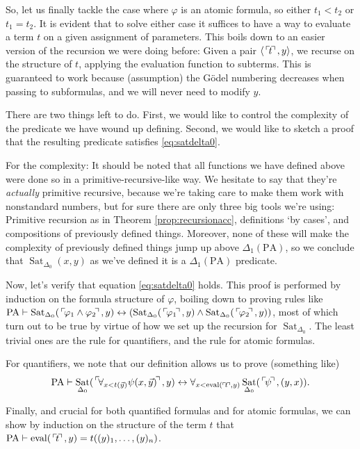 \documentclass{article}
\theoremstyle{nonumberplain}
\newcommand{\PA}{\mathrm{PA}}
\DeclareMathOperator{\Sat}{Sat}
\DeclareMathOperator{\eval}{eval}
\DeclarePairedDelimiter{\braket}{\langle}{\rangle}
\newcommand{\gn}[1]{\setbox0=\hbox{$\mathclap{\phantom{t}}#1$} \dimen0=\ht0 \advance\dimen0 by -1.25ex \,\raise\dimen0\hbox{$\ulcorner$} \! \box0 \! \raise\dimen0\hbox{$\urcorner$}\,}
\newcommand{\ssgn}[1]{\ulcorner\!#1\!\urcorner}
\begin{document}
So, let us finally tackle the case where $\varphi$ is an atomic formula, so either $t_1 < t_2$ or $t_1 = t_2$. It is evident that to solve either case it suffices to have a way to evaluate a term $t$ on a given assignment of parameters. This boils down to an easier version of the recursion we were doing before: Given a pair $\braket{\gn t, y}$, we recurse on the structure of $t$, applying the evaluation function to subterms. This is guaranteed to work because (assumption) the Gödel numbering decreases when passing to subformulas, and we will never need to modify $y$.

There are two things left to do. First, we would like to control the complexity of the predicate we have wound up defining. Second, we would like to sketch a proof that the resulting predicate satisfies \eqref{eq:satdelta0}.

For the complexity: It should be noted that all functions we have defined above were done so in a primitive-recursive-like way. We hesitate to say that they're \emph{actually} primitive recursive, because we're taking care to make them work with nonstandard numbers, but for sure there are only three big tools we're using: Primitive recursion as in Theorem \ref{prop:recursionacc}, definitions `by cases', and compositions of previously defined things. Moreover, none of these will make the complexity of previously defined things jump up above $\Delta_1(\PA)$, so we conclude that $\Sat_{\Delta_0}(x,y)$ as we've defined it is a $\Delta_1(\PA)$ predicate.

Now, let's verify that equation \eqref{eq:satdelta0} holds. This proof is performed by induction on the formula structure of $\varphi$, boiling down to proving rules like $\PA \vdash \Sat_{\Delta_0}(\gn{\varphi_1 \land \varphi_2}, y) \leftrightarrow (\Sat_{\Delta_0}(\gn{\varphi_1}, y) \land \Sat_{\Delta_0}(\gn{\varphi_2}, y))$, most of which turn out to be true by virtue of how we set up the recursion for $\Sat_{\Delta_0}$. The least trivial ones are the rule for quantifiers, and the rule for atomic formulas.

For quantifiers, we note that our definition allows us to prove (something like)
\begin{equation}
\PA \vdash \Sat_{\Delta_0}(\gn{\forall_{x < t(\vec y)} \psi(x,\vec y)}, y) \leftrightarrow \forall_{x < \eval(\ssgn t,y)} \Sat_{\Delta_0}(\gn\psi, (y,x)).
\end{equation}

Finally, and crucial for both quantified formulas and for atomic formulas, we can show by induction on the structure of the term $t$ that $\PA \vdash \eval(\gn t, y) = t((y)_1, \dots, (y)_n)$.
\end{document}

